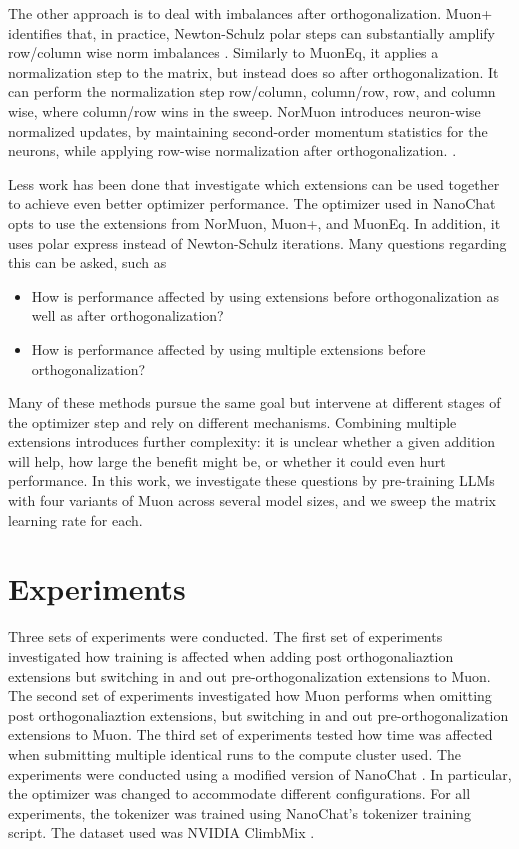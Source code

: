 \documentclass[11pt]{article}
\begin{document}
The other approach is to deal with imbalances after orthogonalization. Muon+ identifies that, in practice, Newton-Schulz polar steps can substantially amplify row/column wise norm imbalances \cite{zhang2026muoneffectivemuonadditional}. Similarly to MuonEq, it applies a normalization step to the matrix, but instead does so after orthogonalization. It can perform the normalization step row/column, column/row, row, and column wise, where column/row wins in the sweep. NorMuon introduces neuron-wise normalized updates, by maintaining second-order momentum statistics for the neurons, while applying row-wise normalization after orthogonalization. \cite{li2025normuonmakingmuonefficient}.

Less work has been done that investigate which extensions can be used together to achieve even better optimizer performance. The optimizer used in NanoChat \cite{nanochat} opts to use the extensions from NorMuon, Muon+, and MuonEq. In addition, it uses polar express \cite{amsel2026polarexpressoptimalmatrix} instead of Newton-Schulz iterations. Many questions regarding this can be asked, such as
\begin{itemize}
    \item How is performance affected by using extensions before orthogonalization as well as after orthogonalization?
    \item How is performance affected by using multiple extensions before orthogonalization?
\end{itemize}

Many of these methods pursue the same goal but intervene at different stages of the optimizer step and rely on different mechanisms. Combining multiple extensions introduces further complexity: it is unclear whether a given addition will help, how large the benefit might be, or whether it could even hurt performance. In this work, we investigate these questions by pre-training LLMs with four variants of Muon across several model sizes, and we sweep the matrix learning rate for each.


\section{Experiments}

Three sets of experiments were conducted. The first set of experiments investigated how training is affected when adding post orthogonaliaztion extensions but switching in and out pre-orthogonalization extensions to Muon. The second set of experiments investigated how Muon performs when omitting post orthogonaliaztion extensions, but switching in and out pre-orthogonalization extensions to Muon. The third set of experiments tested how time was affected when submitting multiple identical runs to the compute cluster used. The experiments were conducted using a modified version of NanoChat \cite{nanochat}. In particular, the optimizer was changed to accommodate different configurations. For all experiments, the tokenizer was trained using NanoChat’s tokenizer training script. The dataset used was NVIDIA ClimbMix \cite{diao2025climb}.
\end{document}
